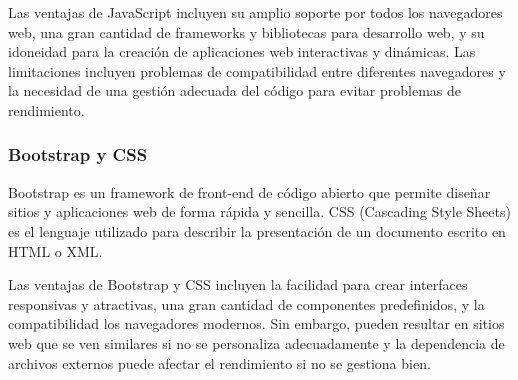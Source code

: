 Las ventajas de JavaScript incluyen su amplio soporte por todos los navegadores web, una gran cantidad de frameworks y bibliotecas para desarrollo web, y su idoneidad para la creación de aplicaciones web interactivas y dinámicas. Las limitaciones incluyen problemas de compatibilidad entre diferentes navegadores y la necesidad de una gestión adecuada del código para evitar problemas de rendimiento.

\subsubsection{Bootstrap y CSS}

Bootstrap es un framework de front-end de código abierto que permite diseñar sitios y aplicaciones web de forma rápida y sencilla. CSS (Cascading Style Sheets) es el lenguaje utilizado para describir la presentación de un documento escrito en HTML o XML\cite{Bootstrap,CSS}.

Las ventajas de Bootstrap y CSS incluyen la facilidad para crear interfaces responsivas y atractivas, una gran cantidad de componentes predefinidos, y la compatibilidad los navegadores modernos. Sin embargo, pueden resultar en sitios web que se ven similares si no se personaliza adecuadamente y la dependencia de archivos externos puede afectar el rendimiento si no se gestiona bien.